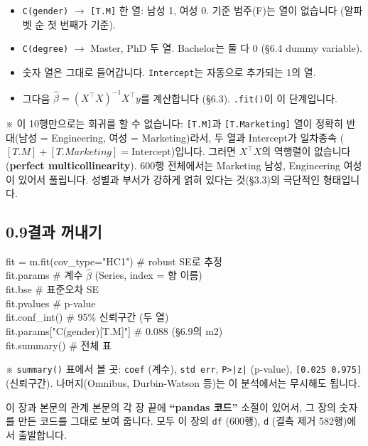 \documentclass[11pt,a4paper]{article}
\newcommand{\term}[1]{\textbf{#1}}
\newcommand{\code}[1]{\texttt{#1}}
\newcommand{\aside}[1]{{\footnotesize\color{black!65}#1}}
\begin{document}
\begin{itemize}
\item \code{C(gender)} $\to$ \code{[T.M]} 한 열: 남성 1, 여성 0. 기준 범주(F)는 열이 없습니다 (알파벳 순 첫 번째가 기준).
\item \code{C(degree)} $\to$ Master, PhD 두 열. Bachelor는 둘 다 0 (\S6.4 dummy variable).
\item 숫자 열은 그대로 들어갑니다. \code{Intercept}는 자동으로 추가되는 1의 열.
\item 그다음 $\hat\beta=(X^\top X)^{-1}X^\top y$를 계산합니다 (\S6.3). \code{.fit()}이 이 단계입니다.
\end{itemize}
\aside{※ 이 10행만으로는 회귀를 할 수 없습니다: \code{[T.M]}과 \code{[T.Marketing]} 열이 정확히 반대(남성 = Engineering, 여성 = Marketing)라서, 두 열과 Intercept가 일차종속 ($[T.M]+[T.Marketing]=\text{Intercept}$)입니다. 그러면 $X^\top X$의 역행렬이 없습니다 (\term{perfect multicollinearity}). 600행 전체에서는 Marketing 남성, Engineering 여성이 있어서 풀립니다. 성별과 부서가 강하게 얽혀 있다는 것(\S3.3)의 극단적인 형태입니다.}

\subsection*{0.9\quad 결과 꺼내기}
\begin{codebox}
fit = m.fit(cov\_type="HC1") \hfill \# robust SE로 추정\\
fit.params \hfill \# 계수 $\hat\beta$ (Series, index = 항 이름)\\
fit.bse \hfill \# 표준오차 SE\\
fit.pvalues \hfill \# p-value\\
fit.conf\_int() \hfill \# 95\% 신뢰구간 (두 열)\\
fit.params["C(gender)[T.M]"] \hfill \# 0.088 (\S6.9의 m2)\\
fit.summary() \hfill \# 전체 표
\end{codebox}
\aside{※ \code{summary()} 표에서 볼 곳: \code{coef} (계수), \code{std err}, \code{P>|z|} (p-value), \code{[0.025 0.975]} (신뢰구간). 나머지(Omnibus, Durbin-Watson 등)는 이 분석에서는 무시해도 됩니다.}

\begin{whybox}{이 장과 본문의 관계}
본문의 각 장 끝에 \textbf{``pandas 코드''} 소절이 있어서, 그 장의 숫자를 만든 코드를 그대로 보여 줍니다. 모두 이 장의 \code{df} (600행), \code{d} (결측 제거 582행)에서 출발합니다.
\end{whybox}
\end{document}
